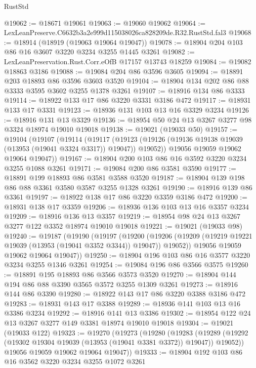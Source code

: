 \begin{lexlean}{RustStd}
\begin{coremodule}
@19062 := @18671 @19061
@19063 := @19060 @19062
@19064 := LexLeanPreserve.C6632b3a2e999d115038026ca828209de.R32.RustStd.fal3
@19068 := @18914 (@18919 (@19063 @19064 @19047))
@19078 := @18904 @204 @103 @86 @16 @3607 @3220 @3234 @3255 @1445 @3261
@19082 := LexLeanPreservation.Rust.Corr.eOfB @17157 @13743 @18259
@19084 := @19082 @18863 @3186
@19088 := @19084 @204 @86 @3596 @3605
@19094 := @18891 @203 @18893 @86 @3596 @3603 @3520
@19104 := @18904 @134 @202 @86 @88 @3333 @3595 @3602 @3255 @1378 @3261
@19107 := @18916 @134 @86 @3333
@19114 := @18922 @133 @17 @86 @3220 @3331 @3186 @472
@19117 := @18931 @133 @17 @3331
@19123 := @18936 @131 @103 @13 @16 @3329 @3234
@19126 := @18916 @131 @13 @3329
@19136 := @18954 @50 @24 @13 @3267 @3277 @98 @3324 @18974 @19010 @19018
@19138 := @19021 (@19033 @50)
@19157 := @19104
    (@19107
      (@19114
        (@19117
          (@19123 (@19126 (@19136 @19138 @19039 (@13953 (@19041 @3324 @3317)) @19047)) @19052))
        @19056
        @19059
        @19062
        @19064
        @19047))
@19167 := @18904 @200 @103 @86 @16 @3592 @3220 @3234 @3255 @1088 @3261
@19171 := @19084 @200 @86 @3581 @3590
@19177 := @18891 @199 @18893 @86 @3581 @3588 @3520
@19187 := @18904 @139 @198 @86 @88 @3361 @3580 @3587 @3255 @1328 @3261
@19190 := @18916 @139 @86 @3361
@19197 := @18922 @138 @17 @86 @3220 @3359 @3186 @472
@19200 := @18931 @138 @17 @3359
@19206 := @18936 @136 @103 @13 @16 @3357 @3234
@19209 := @18916 @136 @13 @3357
@19219 := @18954 @98 @24 @13 @3267 @3277 @122 @3352 @18974 @19010 @19018
@19221 := @19021 (@19033 @98)
@19240 := @19187
    (@19190
      (@19197
        (@19200
          (@19206 (@19209 (@19219 @19221 @19039 (@13953 (@19041 @3352 @3344)) @19047)) @19052))
        @19056
        @19059
        @19062
        @19064
        @19047))
@19250 := @18904 @196 @103 @86 @16 @3577 @3220 @3234 @3255 @1346 @3261
@19254 := @19084 @196 @86 @3566 @3575
@19260 := @18891 @195 @18893 @86 @3566 @3573 @3520
@19270 := @18904 @144 @194 @86 @88 @3390 @3565 @3572 @3255 @1309 @3261
@19273 := @18916 @144 @86 @3390
@19280 := @18922 @143 @17 @86 @3220 @3388 @3186 @472
@19283 := @18931 @143 @17 @3388
@19289 := @18936 @141 @103 @13 @16 @3386 @3234
@19292 := @18916 @141 @13 @3386
@19302 := @18954 @122 @24 @13 @3267 @3277 @149 @3381 @18974 @19010 @19018
@19304 := @19021 (@19033 @122)
@19323 := @19270
    (@19273
      (@19280
        (@19283
          (@19289 (@19292 (@19302 @19304 @19039 (@13953 (@19041 @3381 @3372)) @19047)) @19052))
        @19056
        @19059
        @19062
        @19064
        @19047))
@19333 := @18904 @192 @103 @86 @16 @3562 @3220 @3234 @3255 @1072 @3261

\end{coremodule}
\end{lexlean}
